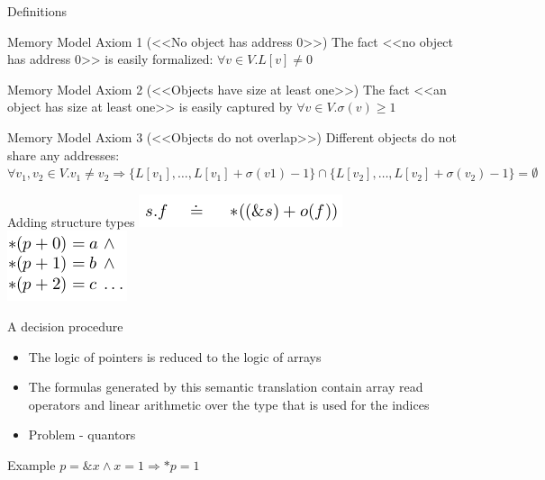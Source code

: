 \documentclass{beamer}
\begin{document}
\begin{frame}{Definitions}
\begin{block}{Memory Model Axiom 1 (<<No object has address 0>>)}
The fact <<no object has address 0>> is easily formalized:\newline
$\forall v \in V.L[v] \ne 0$
\end{block}
\begin{block}{Memory Model Axiom 2 (<<Objects have size at least one>>)}
The fact <<an object has size at least one>> is easily captured by\newline
$\forall v \in V.\sigma(v) \ge 1$
\end{block}
\begin{block}{Memory Model Axiom 3 (<<Objects do not overlap>>)}
Different objects do not share any addresses:\newline
$\forall v_1, v_2 \in V.v_1 \ne v_2 \Rightarrow \{L[v_1], \dots, L[v_1] + \sigma(v1) - 1\} \cap \{L[v_2], \dots, L[v_2] + \sigma(v_2) - 1\} = \emptyset$
\end{block}
\end{frame}

\begin{frame}{Adding structure types}
\includegraphics[scale=0.5]{struct1.png}\newline
\includegraphics[scale=0.5]{struct2.png}\newline
\end{frame}

\begin{frame}{A decision procedure}
\begin{itemize}
\item The logic of pointers is reduced to the logic of arrays
\item The formulas generated by this semantic translation contain array read operators and linear arithmetic over the type that is used for the indices
\item Problem - quantors
\end{itemize}
\end{frame}

\begin{frame}{Example}
$p = \&x \wedge x = 1 \Rightarrow *p = 1$\newline
\end{frame}
\end{document}
